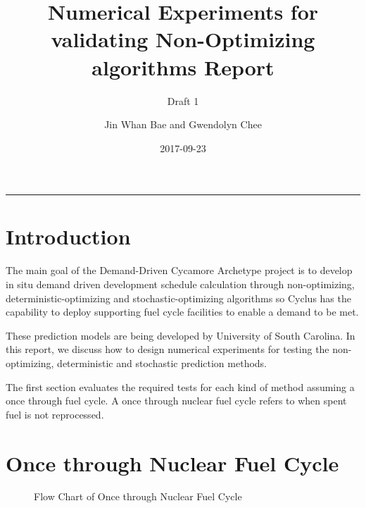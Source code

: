 \documentclass[12pt,letterpaper]{article}
\title{Numerical Experiments for validating Non-Optimizing algorithms Report}
\subtitle{Draft 1}
\author{Jin Whan Bae and Gwendolyn Chee}
\date{2017-09-23}
\begin{document}
	
	\maketitle
	\hrule
	\onehalfspacing
	\thispagestyle{empty}

\section*{Introduction}
The main goal of the Demand-Driven Cycamore Archetype project is to develop in situ demand driven development schedule calculation through non-optimizing, deterministic-optimizing and stochastic-optimizing algorithms so Cyclus has the capability to deploy supporting fuel cycle facilities to enable a demand to be met.

These prediction models are being developed by University of South Carolina. In this report, we discuss how to design numerical experiments for testing the non-optimizing, deterministic and stochastic prediction methods. 

The first section evaluates the required tests for each kind of method assuming a once through fuel cycle. A once through nuclear fuel cycle refers to when spent fuel is not reprocessed. 

\section{Once through Nuclear Fuel Cycle}
\begin{figure}[H]
\caption{Flow Chart of Once through Nuclear Fuel Cycle}
\end{figure}
\end{document}
